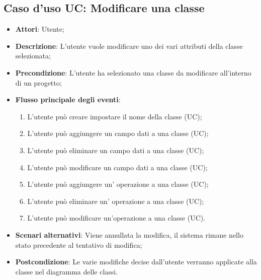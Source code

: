 \documentclass[../AnalisiDeiRequisiti.tex]{subfiles}
\begin{document}
	\subsection{Caso d'uso UC: Modificare una classe}
	\begin{itemize}
		\item \textbf{Attori}: Utente;
		
		\item \textbf{Descrizione}: L'utente vuole modificare uno dei vari attributi della classe selezionata;
		
		\item \textbf{Precondizione}: L'utente ha selezionato una classe da modificare all'interno di un progetto;
		
		\item \textbf{Flusso principale degli eventi}:
		\begin{enumerate}
			\item L'utente può creare impostare il nome della classe (UC);
			\item L'utente può aggiungere un campo dati a una classe (UC);
			\item L'utente può eliminare un campo dati a una classe (UC);
			\item L'utente può modificare un campo dati a una classe (UC);
			\item L'utente può aggiungere un' operazione a una classe (UC);
			\item L'utente può eliminare un' operazione a una classe (UC);
			\item L'utente può modificare un'operazione a una classe (UC).
		\end{enumerate}
		
		\item \textbf{Scenari alternativi}: Viene annullata la modifica, il sistema 
		rimane nello stato precedente al tentativo di modifica;
		
		
		\item \textbf{Postcondizione}: Le varie modifiche decise dall'utente verranno applicate alla classe nel diagramma delle classi.
	\end{itemize}
	
\end{document}
